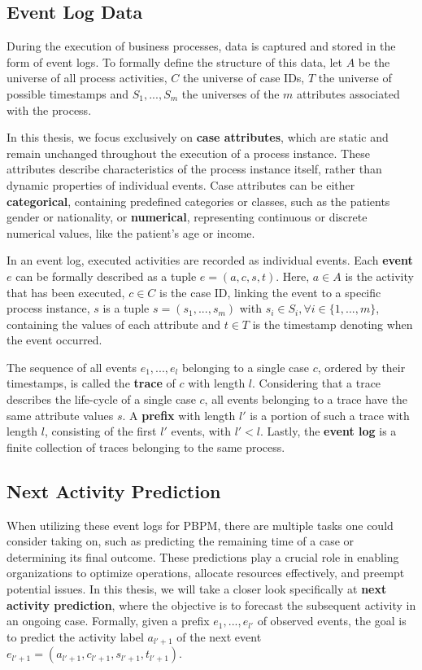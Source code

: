 
\subsection{Event Log Data}
\label{sec:event_log}
During the execution of business processes, data is captured and stored in the form of event logs.
To formally define the structure of this data,
let $A$ be the universe of all process activities,
$C$ the universe of case IDs,
$T$ the universe of possible timestamps
and $S_1, ..., S_m$ the universes of the $m$ attributes associated with the process.

In this thesis, we focus exclusively on \textbf{case attributes},
which are static and remain unchanged throughout the execution of a process instance.
These attributes describe characteristics of the process instance itself,
rather than dynamic properties of individual events.
Case attributes can be either \textbf{categorical},
containing predefined categories or classes, such as the patients gender or nationality,
or \textbf{numerical}, representing continuous or discrete numerical values, like the patient's age or income. 

In an event log, executed activities are recorded as individual events.
Each \textbf{event} $e$ can be formally described as a tuple $e = (a, c, s, t)$.
Here, $a \in A$ is the activity that has been executed,
$c \in C$ is the case ID, linking the event to a specific process instance,
$s$ is a tuple $s = (s_1, ..., s_m)$ with $s_i \in S_i, \forall i \in \{1, ..., m\}$,
containing the values of each attribute
and $t \in T$ is the timestamp denoting when the event occurred.

The sequence of all events $e_1, ..., e_l$ belonging to a single case $c$,
ordered by their timestamps, is called the \textbf{trace} of $c$ with length $l$.
Considering that a trace describes the life-cycle of a single case $c$,
all events belonging to a trace have the same attribute values $s$.
A \textbf{prefix} with length $l'$ is a portion of such a trace with length $l$,
consisting of the first $l'$ events, with $l' < l$.
Lastly, the \textbf{event log} is a finite collection of traces belonging to the same process.


\subsection{Next Activity Prediction}
When utilizing these event logs for PBPM,
there are multiple tasks one could consider taking on,
such as predicting the remaining time of a case or determining its final outcome.
These predictions play a crucial role in enabling organizations to optimize operations,
allocate resources effectively, and preempt potential issues.
In this thesis, we will take a closer look specifically at \textbf{next activity prediction},
where the objective is to forecast the subsequent activity in an ongoing case.
Formally, given a prefix $e_1, ..., e_{l'}$ of observed events,
the goal is to predict the activity label $a_{l'+1}$ of the next event
$e_{l'+1} = (a_{l'+1}, c_{l'+1}, s_{l'+1}, t_{l'+1})$.

